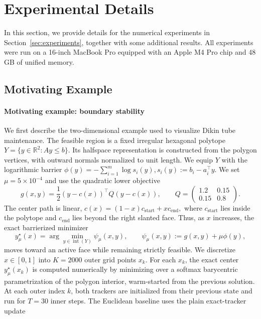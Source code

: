\documentclass{article}
\begin{document}
\section{Experimental Details}
\label{app:experiments}

In this section, we provide details for the numerical experiments in
Section~\ref{sec:experiments}, together with some additional results. All experiments were run on a 16-inch MacBook Pro equipped with an Apple M4 Pro
chip and 48 GB of unified memory.




\subsection{Motivating Example}
\label{app:motivating_example}

\paragraph{Motivating example: boundary stability}
We first describe the two-dimensional example used to visualize Dikin tube maintenance. The feasible
region is a fixed irregular hexagonal polytope \(Y=\{y\in\mathbb R^2:Ay\le b\}\). Its halfspace
representation is constructed from the polygon vertices, with outward normals normalized to unit
length. We equip \(Y\) with the logarithmic barrier
\(
\phi(y)=-\sum_{i=1}^m\log s_i(y),
s_i(y):=b_i-a_i^\top y .
\) We set \(\mu=5\times 10^{-4}\) and use the quadratic lower objective
\[
g(x,y)
=
\frac12 (y-c(x))^\top Q(y-c(x)),
\qquad
Q=
\begin{pmatrix}
1.2 & 0.15\\
0.15 & 0.8
\end{pmatrix}.
\]
The center path is linear,
\(
c(x)=(1-x)c_{\mathrm{start}}+x c_{\mathrm{end}},
\) where \(c_{\mathrm{start}}\) lies inside the polytope and \(c_{\mathrm{end}}\) lies beyond the right
slanted face. Thus, as \(x\) increases, the exact barrierized minimizer
\[
y_\mu^\star(x)
=
\arg\min_{y\in\operatorname{int}(Y)}
\psi_\mu(x,y),
\qquad
\psi_\mu(x,y):=g(x,y)+\mu\phi(y),
\]
moves toward an active face while remaining strictly feasible. We discretize \(x\in[0,1]\) into \(K=2000\) outer grid points \(x_k\). For each \(x_k\), the exact
center \(y_\mu^\star(x_k)\) is computed numerically by minimizing over a softmax barycentric
parametrization of the polygon interior, warm-started from the previous solution. At each outer index
\(k\), both trackers are initialized from their previous state and run for \(T=30\) inner steps. The Euclidean baseline uses the plain exact-tracker update
\end{document}
